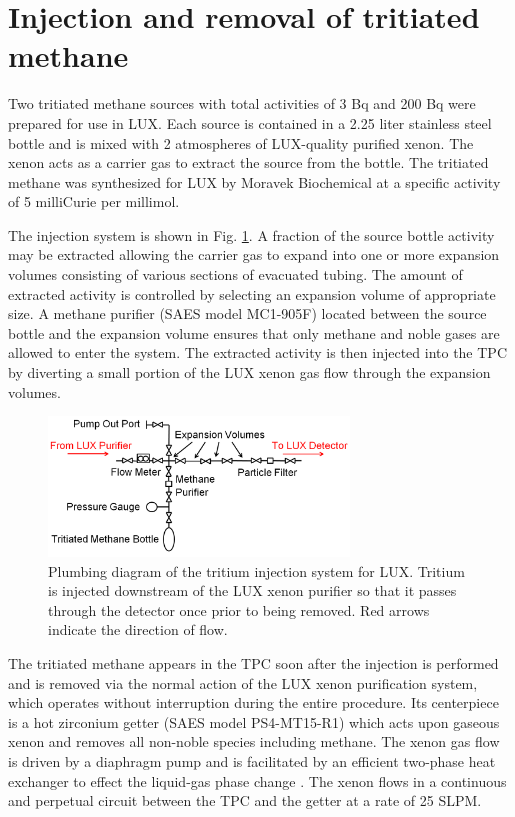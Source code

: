 
\section{Injection and removal of tritiated methane}

Two tritiated methane sources with total activities of 3 Bq and 200 Bq were prepared for use in LUX. Each source is contained in a 2.25 liter stainless steel bottle and is mixed with 2 atmospheres of LUX-quality purified xenon. The xenon acts as a carrier gas to extract the source from the bottle. The tritiated methane was synthesized for LUX by Moravek Biochemical \cite{moravek} at a specific activity of 5 milliCurie per millimol.

The injection system is shown in Fig. \ref{fig:plumbing}. A fraction of the source bottle activity may be extracted allowing the carrier gas to expand into one or more expansion volumes consisting of various sections of evacuated tubing. The amount of extracted activity is controlled by selecting an expansion volume of appropriate size. A methane purifier (SAES model MC1-905F) located between the source bottle and the expansion volume ensures that only methane and noble gases are allowed to enter the system. The extracted activity is then injected into the TPC by diverting a small portion of the LUX xenon gas flow through the expansion volumes. 

\begin{figure}[H]\centering
\includegraphics[width=80mm]{TritiumPlumbing.png}
\caption{Plumbing diagram of the tritium injection system for LUX.  Tritium is injected downstream of the LUX xenon purifier so that it passes through the detector once prior to being removed.  Red arrows indicate the direction of flow.}
\label{fig:plumbing}
\end{figure}

The tritiated methane appears in the TPC soon after the injection is performed and is removed via the normal action of the LUX xenon purification system, which operates without interruption during the entire procedure. Its centerpiece is a hot zirconium getter (SAES model PS4-MT15-R1) which acts upon gaseous xenon and removes all non-noble species including methane. The xenon gas flow is driven by a diaphragm pump and is facilitated by an efficient two-phase heat exchanger to effect the liquid-gas phase change \cite{two phase_hx}. The xenon flows in a continuous and perpetual circuit between the TPC and the getter at a rate of 25 SLPM. 

